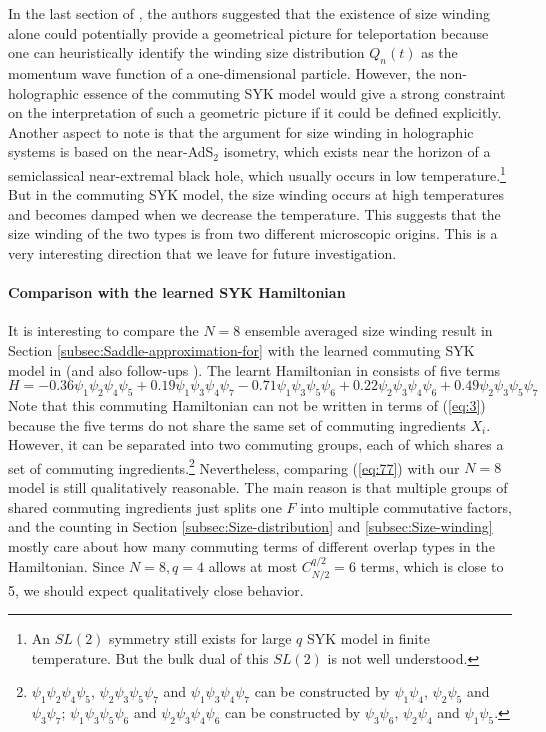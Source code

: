 \documentclass[11pt]{article}
\renewcommand{\>}{\rangle}
\newcommand{\<}{\langle}
\begin{document}
In the last section of \cite{Nezami:2021yaq}, the authors suggested that the
existence of size winding alone could potentially provide a geometrical
picture for teleportation because one can heuristically identify the
winding size distribution $Q_{n}(t)$ as the momentum wave function
of a one-dimensional particle. However, the non-holographic essence
of the commuting SYK model would give a strong constraint on the interpretation
of such a geometric picture if it could be defined explicitly. Another
aspect to note is that the argument for size winding in holographic
systems \cite{Nezami:2021yaq} is based on the near-AdS$_{2}$ isometry, which
exists near the horizon of a semiclassical near-extremal black hole,
which usually occurs in low temperature.\footnote{An $SL(2)$ symmetry still exists for large
$q$ SYK model in finite temperature. But the bulk dual of this $SL(2)$
is not well understood.} But in the commuting SYK model, the size winding occurs at high temperatures
and becomes damped when we decrease the temperature. This suggests that the size winding of the two types is from two different microscopic origins. This is a very interesting direction that we leave for future
investigation.

\paragraph{Comparison with the learned SYK Hamiltonian}

It is interesting to compare the $N=8$ ensemble averaged size winding
result in Section \ref{subsec:Saddle-approximation-for} with the
learned commuting SYK model in \cite{Jafferis:2022crx}  (and also follow-ups \cite{Kobrin:2023rzr,Jafferis:2023moh}).
The learnt Hamiltonian in \cite{Jafferis:2022crx}  consists of five terms
\begin{equation}
H=-0.36\psi_{1}\psi_{2}\psi_{4}\psi_{5}+0.19\psi_{1}\psi_{3}\psi_{4}\psi_{7}-0.71\psi_{1}\psi_{3}\psi_{5}\psi_{6}+0.22\psi_{2}\psi_{3}\psi_{4}\psi_{6}+0.49\psi_{2}\psi_{3}\psi_{5}\psi_{7}\label{eq:77}
\end{equation}
Note that this commuting Hamiltonian can not be written in terms of
(\ref{eq:3}) because the five terms do not share the same set of
commuting ingredients $X_{i}$. However, it can be separated into
two commuting groups, each of which shares a set of commuting ingredients.\footnote{$\psi_{1}\psi_{2}\psi_{4}\psi_{5}$, $\psi_{2}\psi_{3}\psi_{5}\psi_{7}$
and $\psi_{1}\psi_{3}\psi_{4}\psi_{7}$ can be constructed by $\psi_{1}\psi_{4}$,
$\psi_{2}\psi_{5}$ and $\psi_{3}\psi_{7}$; $\psi_{1}\psi_{3}\psi_{5}\psi_{6}$
and $\psi_{2}\psi_{3}\psi_{4}\psi_{6}$ can be constructed by $\psi_{3}\psi_{6}$,
$\psi_{2}\psi_{4}$ and $\psi_{1}\psi_{5}$.} Nevertheless, comparing (\ref{eq:77}) with our $N=8$ model is still
qualitatively reasonable. The main reason is that multiple groups
of shared commuting ingredients just splits one $F$ into multiple
commutative factors, and the counting in Section \ref{subsec:Size-distribution}
and \ref{subsec:Size-winding} mostly care about how many commuting
terms of different overlap types in the Hamiltonian. Since $N=8,q=4$
allows at most $C_{N/2}^{q/2}=6$ terms, which is close to 5, we should
expect qualitatively close behavior.
\end{document}
